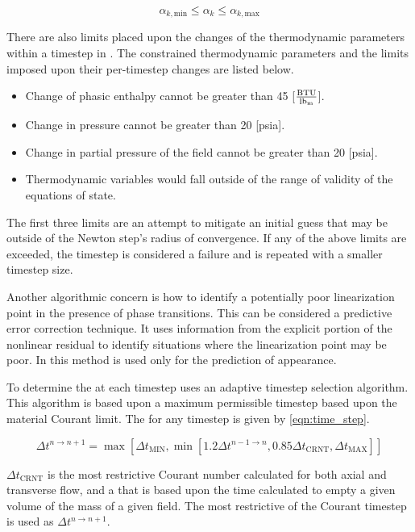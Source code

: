 \begin{equation}
\label{eqn:volume_fraction}
\alpha_{k,\text{min}} \leq \alpha_k \leq \alpha_{k,\text{max}} 
\end{equation}

There are also limits placed upon the changes of the thermodynamic parameters within a timestep in \cobra{}.
The constrained thermodynamic parameters and the limits imposed upon their per-timestep changes are listed below.

\begin{itemize}
\item{Change of phasic enthalpy cannot be greater than 45 [$\frac{\text{BTU}}{\lbm{}}$].}
\item{Change in pressure cannot be greater than 20 [psia].}
\item{Change in partial pressure of the \ncg{} field cannot be greater than 20 [psia].}
\item{Thermodynamic variables would fall outside of the range of validity of the equations of state.}
\end{itemize}

The first three limits are an attempt to mitigate an initial guess that may be outside of the Newton step's radius of convergence.
If any of the above limits are exceeded, the timestep is considered a failure and is repeated with a smaller timestep size.

Another algorithmic concern is how to identify a potentially poor linearization point in the presence of phase transitions. 
This can be considered a predictive error correction technique.
It uses information from the explicit portion of the nonlinear residual to identify situations where the linearization point may be poor.
In \cobra{} this method is used only for the prediction of \ncg{} appearance.

To determine the \dt{} at each timestep \cobra{} uses an adaptive timestep selection algorithm.
This algorithm is based upon a maximum permissible timestep based upon the material Courant limit.
The \dt{} for any timestep is given by \eqref{eqn:time_step}.

\begin{equation}
\label{eqn:time_step}
\Delta t^{n \rightarrow n+1} = \max\left[ \Delta t_{\text{MIN}}, \min\left[1.2 \Delta t^{n-1 \rightarrow n}, 0.85 \Delta t_{\text{CRNT}}, \Delta t_{\text{MAX}} \right]\right]
\end{equation}

$\Delta t_{\text{CRNT}}$ is the most restrictive Courant number calculated for both axial and transverse flow, and a \dt{} that is based upon the time calculated to empty a given volume of the mass of a given field.
The most restrictive of the Courant timestep is used as $\Delta t^{n \rightarrow n+1}$.


